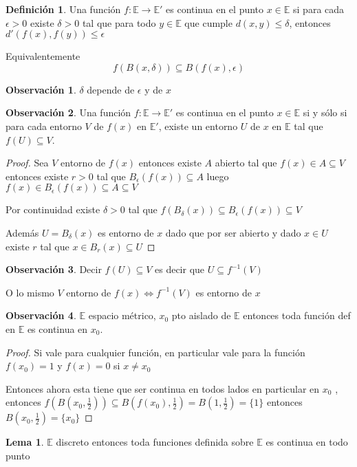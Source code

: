 \documentclass[12pt]{article}
\newcommand{\E}{\mathbb{E}}
\newcommand{\ra}{\rightarrow}
\theoremstyle{definition}
\newtheorem{definition}{Definición}[section]
\newtheorem*{remark}{Observación}
\newtheorem{lemma}[theorem]{Lema}
\begin{document}
\begin{definition}
  Una función $f: \E \ra \E'$ es continua en el punto $x \in \E$ si para cada $\epsilon > 0$ existe $\delta > 0$ tal que para todo $y \in \E$ que cumple $ d(x,y) \leq \delta$, entonces $d'(f(x),f(y)) \leq \epsilon$

  Equivalentemente $$ f(B(x,\delta)) \subseteq B(f(x),\epsilon)$$
\end{definition}
\begin{remark}
  $\delta$ depende de $\epsilon$ y de $x$
\end{remark}
\begin{remark}
  Una función $f:\E \ra \E'$ es continua en el punto $x \in \E$ si y sólo si para cada entorno $V$ de $f(x)$ en $\E '$, existe un entorno $U$ de $x$ en $\E$ tal que $f(U) \subseteq V$.
\begin{proof}
Sea $V$ entorno de $f(x)$ entonces existe $A$ abierto tal que $f (x) \in  A \subseteq V$ entonces existe $r>0$ tal que $ B_{\epsilon}(f(x)) \subseteq A$ luego $f(x ) \in B_{\epsilon}(f(x)) \subseteq A \subseteq V$

Por continuidad existe $\delta >0$ tal que $f(B_{\delta}(x)) \subseteq B_{\epsilon}(f(x)) \subseteq V$

Además $U = B_{\delta}(x)$ es entorno de $x$ dado que por ser abierto y dado $x \in U$ existe $r$ tal que $x \in B_r(x) \subseteq U$


\end{proof}
\end{remark}
\begin{remark}
  Decir $f(U) \subseteq V$ es decir que $U \subseteq f^{-1}(V)$

  O lo mismo $V$ entorno de $f(x) \iff f^{-1}(V)$ es entorno de $x$
\end{remark}
\begin{remark}
 $\E$ espacio métrico, $x_0$ pto aislado de $\E $ entonces toda función def en $\E$ es continua en $x_0$.
 \begin{proof}
   Si vale para cualquier función, en particular vale para la función $f(x_0) = 1$ y $f(x) = 0$ si $x \neq x_0$

 Entonces ahora esta tiene que ser continua en todos lados en particular en $x_0$ , entonces $f(B(x_0,\frac{1}{2})) \subseteq B(f(x_0),\frac{1}{2}) = B(1,\frac{1}{2}) = \{1\}$ entonces $B(x_0,\frac{1}{2}) = \{x_0\}$
 \end{proof}

\end{remark}
\begin{lemma}
 $\E $ discreto entonces toda funciones definida sobre $\E$ es continua en todo punto 
\end{lemma}
\end{document}
